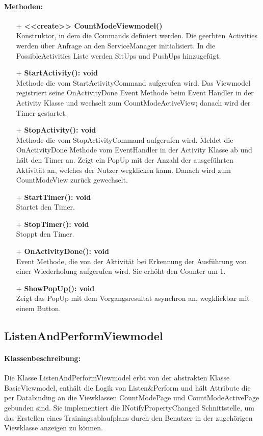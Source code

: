 \documentclass[a4paper,12pt]{article}
\begin{document}
\paragraph{Methoden:}
\begin{itemize}
	\item[+] \textbf{<<create>> CountModeViewmodel()} \\ Konstruktor, in dem die Commands definiert werden. Die geerbten Activities werden über Anfrage an den ServiceManager initialisiert. In die PossibleActivities Liste werden SitUps und PushUps hinzugefügt.
	\item[+] \textbf{StartActivity(): void} \\ Methode die vom StartActivityCommand aufgerufen wird. Das Viewmodel registriert seine OnActivityDone Event Methode beim Event Handler in der Activity Klasse und wechselt zum CountModeActiveView; danach wird der Timer gestartet. 
	\item[+] \textbf{StopActivity(): void} \\ Methode die vom StopActivityCommand aufgerufen wird. Meldet die OnActivityDone Methode vom EventHandler in der Activity Klasse ab und hält den Timer an. Zeigt ein PopUp mit der Anzahl der ausgeführten Aktivität an, welches der Nutzer wegklicken kann. Danach wird zum CountModeView zurück gewechselt. 
	\item[+] \textbf{StartTimer(): void} \\ Startet den Timer. 
	\item[+] \textbf{StopTimer(): void} \\ Stoppt den Timer. 
	\item[+] \textbf{OnActivityDone(): void} \\ Event Methode, die von der Aktivität bei Erkennung der Ausführung von einer Wiederholung aufgerufen wird. Sie erhöht den Counter um 1. 
	\item[+] \textbf{ShowPopUp(): void} \\ Zeigt das PopUp mit dem Vorgangsresultat asynchron an, wegklickbar mit einem Button. 
\end{itemize}

\subsection{ListenAndPerformViewmodel}
\paragraph{Klassenbeschreibung:}
Die Klasse ListenAndPerformViewmodel erbt von der abstrakten Klasse BasicViewmodel, enthält die Logik von Listen\&Perform und hält Attribute die per Databinding an die Viewklassen CountModePage und CountModeActivePage gebunden sind.  Sie implementiert die INotifyPropertyChanged Schnittstelle, um das Erstellen eines Trainingsablaufplans durch den Benutzer in der zugehörigen Viewklasse anzeigen zu können.
\end{document}
